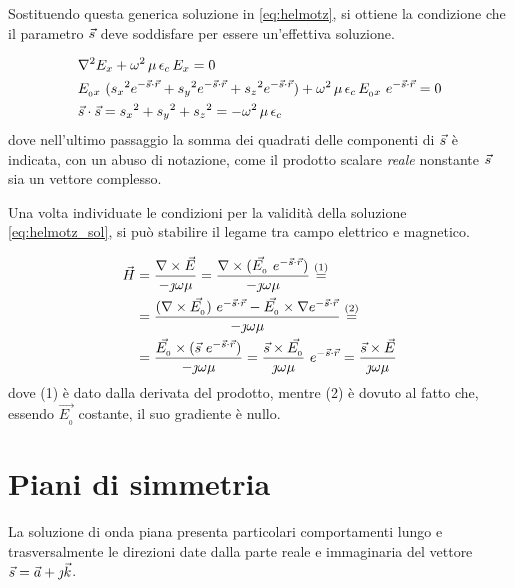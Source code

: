 	Sostituendo questa generica soluzione in \eqref{eq:helmotz}, si ottiene la condizione che il parametro $\vec{s}$ deve soddisfare per essere un'effettiva soluzione.

	\begin{equation} \label{eq:condizione_s}
		\begin{split}
			& \nabla^2 E_x+ \omega^2 \, \mu \, \epsilon_c \, E_x = 0 \\
			& E_{_0 x} ~ ({s_x}^2 e^{-\vec{s} \cdot \vec{r}} +
				{s_y}^2 e^{-\vec{s} \cdot \vec{r}} +
				{s_z}^2 e^{-\vec{s} \cdot \vec{r}}) +
				\omega^2 \, \mu \, \epsilon_c \, E_{_{0}x} ~ e^{-\vec{s} \cdot \vec{r}} = 0 \\
			& \vec{s} \cdot \vec{s} = {s_x}^2 + {s_y}^2 + {s_z}^2 = - \omega^2 \, \mu \, \epsilon_c
		\end{split}
	\end{equation}
	dove nell'ultimo passaggio la somma dei quadrati delle componenti di $\vec{s}$ è indicata, con un abuso di notazione, come il prodotto scalare \emph{reale} nonstante $\vec{s}$ sia un vettore complesso.

	Una volta individuate le condizioni per la validità della soluzione \eqref{eq:helmotz_sol}, si può stabilire il legame tra campo elettrico e magnetico.

	\begin{equation*}
		\begin{split}
			\vec{H} & = \frac {\nabla\times\vec{E}}{- \jmath \omega \mu} =
				\frac {\nabla\times(\vec{E_{_{0}}} ~ e^{-\vec{s} \cdot \vec{r}})}{- \jmath \omega \mu} \stackrel{(1)}{=} \\
			& = \frac {(\nabla\times\vec{E_{_{0}}}) ~ e^{-\vec{s} \cdot \vec{r}} - \vec{E_{_{0}}} \times \nabla e^{-\vec{s} \cdot \vec{r}}} {- \jmath \omega \mu} \stackrel{(2)}{=} \\
			& = \frac{ \vec{E_{_{0}}} \times ( \vec{s} ~ e^{-\vec{s} \cdot \vec{r}})} {- \jmath \omega \mu} = \frac { \vec{s} \times \vec{E_{_{0}}}} {\jmath \omega \mu}
			~ e^{-\vec{s} \cdot \vec{r}} = \frac{\vec{s} \times \vec{E}}{\jmath \omega \mu} \\
		\end{split}
	\end{equation*}
	dove (1) è dato dalla derivata del prodotto, mentre (2) è dovuto al fatto che, essendo $\vec{E_{_{0}}}$ costante, il suo gradiente è nullo.

\section{Piani di simmetria}
	La soluzione di onda piana presenta particolari comportamenti lungo e trasversalmente le direzioni date dalla parte reale e immaginaria del vettore $\vec{s} = \vec{a} + \jmath \vec{k}$.

